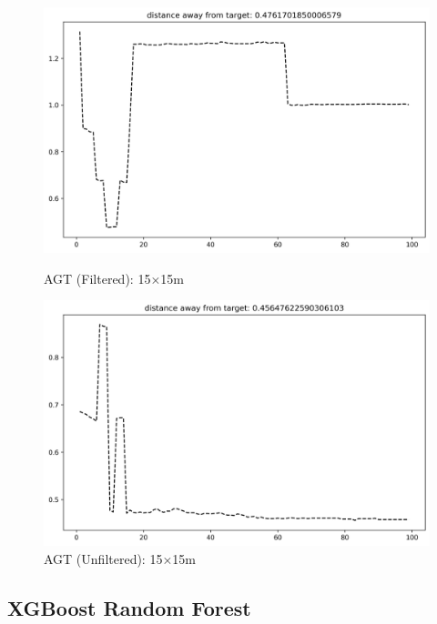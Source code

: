 \documentclass[runningheads]{llncs}
\begin{document}
\begin{figure}[H]
	\centering
	\begin{minipage}{0.49\textwidth}
		\centering
		\includegraphics[width=\textwidth]{figures/filtered/xgb_softmax_custom_15.png}
		\caption*{AGT (Filtered): 15×15m}
	\end{minipage}
	\hfill
	\begin{minipage}{0.49\textwidth}
		\centering
		\includegraphics[width=\textwidth]{figures/unfiltered/xgb_softmax_custom_15.png}
		\caption*{AGT (Unfiltered): 15×15m}
	\end{minipage}
\end{figure}

\clearpage

\subsection*{XGBoost Random Forest}
\end{document}

